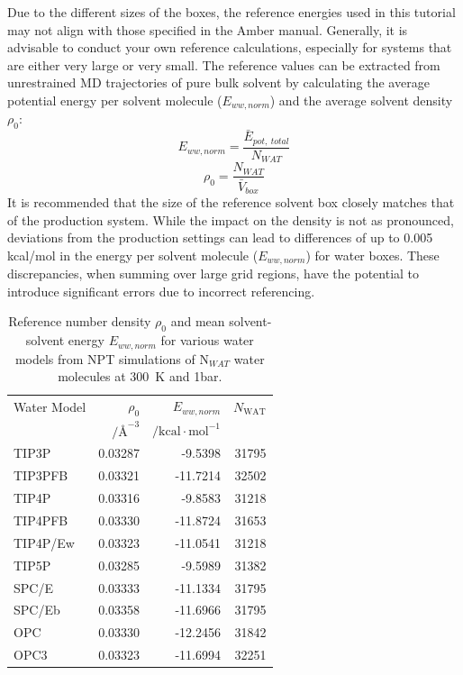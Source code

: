 \documentclass[9pt,tutorial]{livecoms}
\begin{document}
Due to the different sizes of the boxes, the reference energies used in this tutorial may not align with those specified in the Amber manual. 
Generally, it is advisable to conduct your own reference calculations, especially for systems that are either very large or very small. 
The reference values can be extracted from unrestrained MD trajectories of pure bulk solvent by calculating the average potential energy per solvent molecule ($E_{ww, norm}$) and the average solvent density $\rho_0$:
\begin{equation}
	E_{ww, norm} = \frac{\bar{E}_{pot,\ total}}{N_{WAT}}
\end{equation}	
\begin{equation}
	\rho_0 = \frac{N_{WAT}}{\bar{V}_{box}}
\end{equation}
It is recommended that the size of the reference solvent box closely matches that of the production system.
While the impact on the density is not as pronounced, deviations from the production settings can lead to differences of up to 0.005 kcal/mol in the energy per solvent molecule ($E_{ww, norm}$) for water boxes. 
These discrepancies, when summing over large grid regions, have the potential to introduce significant errors due to incorrect referencing.

\begin{table}[h]

	\caption{Reference number density $\rho_0$ and mean solvent-solvent energy $E_{ww, norm}$ for various water models from NPT simulations of N$_{WAT}$ water molecules at \qty{300}{\kelvin} and 1bar.}\label{tab:ref_densities}
	\small
	\begin{tabularx}{\columnwidth}{@{}lrrr@{}}
		\toprule
		Water Model       & $\rho_0$ & $E_{ww, norm}$ & $N_\text{WAT}$ \\
        & $/\text{\AA{}}^{-3}$ & $/\text{kcal}\cdot \text{mol}^{-1}$ & \\
		\midrule
		TIP3P \cite{Jorgensen1983-tip3p}    & 0.03287 & -9.5398   & 31795 \\
		TIP3PFB \cite{Wang2014-tip3p-force-balance}  & 0.03321 & -11.7214  & 32502 \\
		TIP4P \cite{Jorgensen1985-tip4p}    & 0.03316 & -9.8583   & 31218 \\
       TIP4PFB \cite{Wang2014-tip3p-force-balance} & 0.03330 & -11.8724   & 31653 \\
		TIP4P/Ew \cite{Horn2004-tip4pew} & 0.03323 & -11.0541  & 31218 \\
		TIP5P \cite{Mahoney2000-tip5p}    & 0.03285 & -9.5989   & 31382 \\
		SPC/E \cite{Berendsen1987-spce}    & 0.03333 & -11.1334  & 31795 \\
       SPC/Eb \cite{Takemura2012-spceb}   & 0.03358 & -11.6966 & 31795 \\
		OPC \cite{Izadi2014-opc}      & 0.03330 & -12.2456 & 31842 \\
		OPC3 \cite{Izadi2016-opc3}     & 0.03323 & -11.6994 & 32251 \\
		\bottomrule
	\end{tabularx}
\end{table}
\pagebreak %
\end{document}

